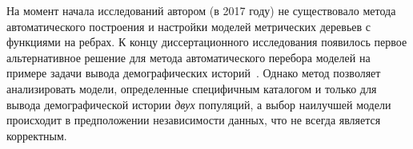 На момент начала исследований автором (в 2017 году) не существовало метода автоматического построения и настройки моделей метрических деревьев с функциями на ребрах.
К концу диссертационного исследования появилось первое альтернативное решение для метода автоматического перебора моделей на примере задачи вывода демографических историй~\cite{rippe2021environmental}.
Однако метод позволяет анализировать модели, определенные специфичным каталогом и только для вывода демографической истории \emph{двух} популяций, а выбор наилучшей модели происходит в предположении независимости данных, что не всегда является корректным.\\





